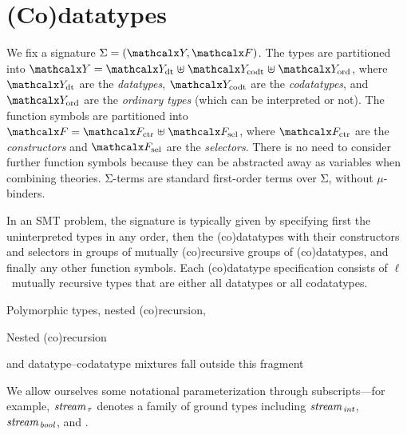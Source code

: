 
\section{%
(Co)datatypes}
\label{sec:co-datatypes}


{
We fix a signature $\Sig = (\Types, \Funcs)$. The types are partitioned into
$\Types = \Data \mathrel{\uplus} \Codata \mathrel{\uplus} \Nondata$, where $\Data$ are the
\emph{datatypes}, $\Codata$ are the \emph{codatatypes}, and $\Nondata$ are the %
\emph{ordinary types} (which can be interpreted or not). The function symbols are
partitioned into $\Funcs = \Ctr \mathrel{\uplus} \Sel$, where $\Ctr$ are the
\emph{constructors} and $\Sel$ are the \emph{selectors}. There is no need to
consider further function symbols because they can be abstracted away as
variables when combining theories. $\mathrm\Sigma$-terms are standard first-order terms
over $\mathrm\Sigma$,
without $\mu$-binders.

}

In an SMT problem, the signature is typically given by specifying first the
uninterpreted %
types in any order, then the (co)datatypes with their constructors
and selectors in groups of mutually (co)recursive groups of (co)datatypes, and
finally any other function symbols.
%
Each (co)datatype specification consists of $\ell$~mutually recursive types that are
either all datatypes or all codatatypes. \begin{rep}Polymorphic types, nested
(co)recursion,\end{rep}\begin{conf}Nested (co)recursion\end{conf} and datatype--codatatype mixtures fall outside this fragment%
\begin{rep}We allow ourselves some notational parameterization
through subscripts---for example, $\textit{stream}_{\,\tau}$ denotes a
family of ground types including
$\textit{stream}_{\,\textit{int}}$, $\textit{stream}_{\,\textit{bool}}$,
and .\end{rep}

